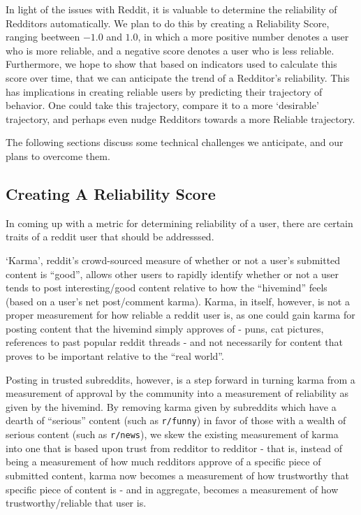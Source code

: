 In light of the issues with Reddit, it is valuable to determine the reliability
of Redditors automatically. We plan to do this by creating a Reliability Score,
ranging beetween $-1.0$ and $1.0$, in which a more positive number denotes a
user who is more reliable, and a negative score denotes a user who is less
reliable. Furthermore, we hope to show that based on indicators used to
calculate this score over time, that we can anticipate the trend of a Redditor's
reliability. This has implications in creating reliable users by predicting
their trajectory of behavior. One could take this trajectory, compare it to a
more `desirable' trajectory, and perhaps even nudge Redditors towards a more
Reliable trajectory.

The following sections discuss some technical challenges we anticipate, and our
plans to overcome them.

\subsection{Creating A Reliability Score}
\label{sub:creating_a_reliability_score}

In coming up with a metric for determining reliability of a user, there are
certain traits of a reddit user that should be addresssed.

`Karma', reddit's crowd-sourced measure of whether or not a user's submitted
content is ``good'', allows other users to rapidly identify whether or not a
user tends to post interesting/good content relative to how the ``hivemind''
feels (based on a user's net post/comment karma). Karma, in itself, however, is
not a proper measurement for how reliable a reddit user is, as one could gain
karma for posting content that the hivemind simply approves of - puns, cat
pictures, references to past popular reddit threads - and not necessarily for
content that proves to be important relative to the ``real world''.

Posting in trusted subreddits, however, is a step forward in turning karma from
a measurement of approval by the community into a measurement of reliability as
given by the hivemind. By removing karma given by subreddits which have a dearth
of ``serious'' content (such as \texttt{r/funny}) in favor of those with a
wealth of serious content (such as \texttt{r/news}), we skew the existing
measurement of karma into one that is based upon trust from redditor to
redditor - that is, instead of being a measurement of how much redditors approve
of a specific piece of submitted content, karma now becomes a measurement of how
trustworthy that specific piece of content is - and in aggregate, becomes a
measurement of how trustworthy/reliable that user is.

